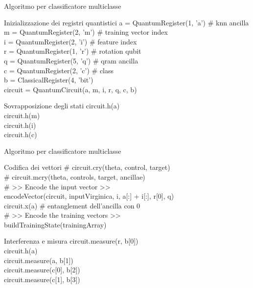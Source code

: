 \documentclass{beamer}
\begin{document}
    \begin{frame}{Algoritmo per classificatore multiclasse}
        \begin{block}{Inizializzazione dei registri quantistici}
            a = QuantumRegister(1, 'a') \# knn ancilla \\
            m = QuantumRegister(2, 'm') \# training vector index \\
            i = QuantumRegister(2, 'i') \# feature index \\
            r = QuantumRegister(1, 'r') \# rotation qubit \\
            q = QuantumRegister(5, 'q') \# qram ancilla \\
            c = QuantumRegister(2, 'c') \# class \\
            b = ClassicalRegister(4, 'bit') \\
            circuit = QuantumCircuit(a, m, i, r, q, c, b)
        \end{block}

        \begin{block}{Sovrapposizione degli stati}
            circuit.h(a) \\
            circuit.h(m) \\
            circuit.h(i) \\
            circuit.h(c)
        \end{block}
    \end{frame}

    \begin{frame}{Algoritmo per classificatore multiclasse}
        \begin{block}{Codifica dei vettori}
            \# circuit.cry(theta, control, target) \\
            \# circuit.mcry(theta, controls, target, ancillae) \\

            \# >> Encode the input vector >> \\

            encodeVector(circuit, inputVirginica, i, a[:] + i[:], r[0], q) \\ 

            circuit.x(a) \# entanglement dell'ancilla con 0 \\

            \# >> Encode the training vectors >> \\

            buildTrainingState(trainingArray) \\
        \end{block}
        \begin{block}{Interferenza e misura}
            circuit.measure(r, b[0]) \\
            circuit.h(a) \\
            circuit.measure(a, b[1]) \\
            circuit.measure(c[0], b[2]) \\
            circuit.measure(c[1], b[3])
        \end{block}
    \end{frame}
\end{document}
